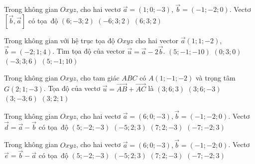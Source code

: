 \begin{ex}%
	Trong không  gian $Oxyz$, cho hai vectơ $\overrightarrow{a}=(1; 0;-3)$, $\overrightarrow{b}=(-1;-2; 0)$. Vectơ $\left[\overrightarrow{b}, \overrightarrow{a}\right]$ có tọa~độ
		{\True  $(6;-3; 2)$}
		{$(-6; 3;  2)$}
		{$(6; 3;  2)$}
\end{ex}

\begin{ex}%
	Trong không gian với hệ trục tọa độ $Oxyz$ cho hai vector $\overrightarrow{a}(1;1;-2)$, $\overrightarrow{b}=(-2;1;4)$. Tìm tọa  độ của vector $\overrightarrow{u}=\overrightarrow{a}-2\overrightarrow{b}$.
	 \choice
		{\True  $(5;-1;-10)$}
		{$(0;3;0)$} 
		 {$(-3;3;6)$}
		 {$(5;-1;10)$}
\end{ex}

\begin{ex}%
	Trong không gian $Oxyz$, cho tam giác $ABC$ có $A(1;-1;-2)$ và  trọng tâm $G(2;1;-3)$. Tọa độ của vectơ $\overrightarrow{u}=\overrightarrow{AB}+\overrightarrow{AC}$ là
	 \choice
		 {$(3;6;3)$}
		 {\True $(3;6;-3)$}
		 {$(3;-3;6)$}
		{$(3;2;1)$} 
\end{ex}

\begin{ex}%
	Trong không gian $Oxyz$, cho hai vectơ $\overrightarrow{a}=\left(6;0;-3 \right),\overrightarrow{b}=\left(-1;-2;0 \right)$. Vectơ  $\overrightarrow{d}=\overrightarrow{a}-\overrightarrow{b}$ có tọa~độ
	 \choice
		{$\left(5;-2;-3  \right)$}
		{$\left(-5;2;3  \right)$}
		 {\True $\left(7;2;-3 \right)$}
		 {$\left(-7;-2;3 \right)$}
\end{ex}

\begin{ex}%
	Trong không gian $Oxyz$, cho hai vectơ $\overrightarrow{a}=\left(6;0;-3 \right),\overrightarrow{b}=\left(-1;-2;0 \right)$. Vectơ $\overrightarrow{e}=\overrightarrow{b}-\overrightarrow{a}$ có  tọa~độ
	\choice 
		 {$\left(5;-2;-3 \right)$}
		 {$\left(-5;2;3 \right)$}
		{$\left(7;2;-3  \right)$}
		 {\True $\left(-7;-2;3 \right)$}
\end{ex}

